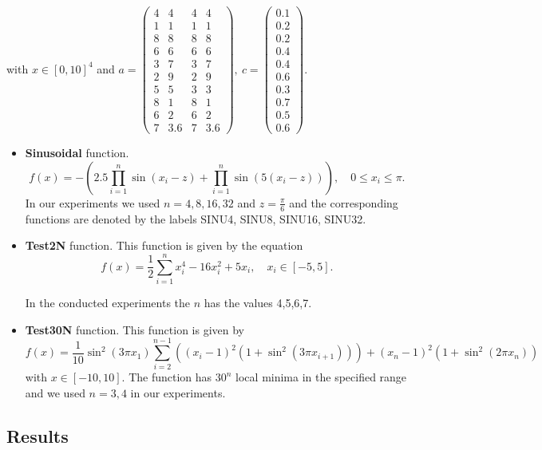 \documentclass[symmetry,article,submit,moreauthors,pdftex]{Definitions/mdpi}
\begin{document}
with $x\in[0,10]^{4}$ and $a=\left(\begin{array}{cccc}
4 & 4 & 4 & 4\\
1 & 1 & 1 & 1\\
8 & 8 & 8 & 8\\
6 & 6 & 6 & 6\\
3 & 7 & 3 & 7\\
2 & 9 & 2 & 9\\
5 & 5 & 3 & 3\\
8 & 1 & 8 & 1\\
6 & 2 & 6 & 2\\
7 & 3.6 & 7 & 3.6
\end{array}\right),\ c=\left(\begin{array}{c}
0.1\\
0.2\\
0.2\\
0.4\\
0.4\\
0.6\\
0.3\\
0.7\\
0.5\\
0.6
\end{array}\right)$. 
\begin{itemize}
\item \textbf{Sinusoidal} function. 
\[
f(x)=-\left(2.5\prod_{i=1}^{n}\sin\left(x_{i}-z\right)+\prod_{i=1}^{n}\sin\left(5\left(x_{i}-z\right)\right)\right),\quad0\le x_{i}\le\pi.
\] In our experiments we used $n=4,8,16,32$
and $z=\frac{\pi}{6}$ and the corresponding functions are denoted
by the labels SINU4, SINU8, SINU16, SINU32.
\item \textbf{Test2N} function. This function is given by the equation 
\[
f(x)=\frac{1}{2}\sum_{i=1}^{n}x_{i}^{4}-16x_{i}^{2}+5x_{i},\quad x_{i}\in[-5,5].
\]

In the conducted experiments the $n$ has the values 4,5,6,7.

\item \textbf{Test30N} function. This function is given by 
\[
f(x)=\frac{1}{10}\sin^{2}\left(3\pi x_{1}\right)\sum_{i=2}^{n-1}\left(\left(x_{i}-1\right)^{2}\left(1+\sin^{2}\left(3\pi x_{i+1}\right)\right)\right)+\left(x_{n}-1\right)^{2}\left(1+\sin^{2}\left(2\pi x_{n}\right)\right)
\]
with $x\in[-10,10]$. The function has $30^{n}$ local minima in the
specified range and we used $n=3,4$ in our experiments. 
\end{itemize}

\subsection{Results}
\end{document}
